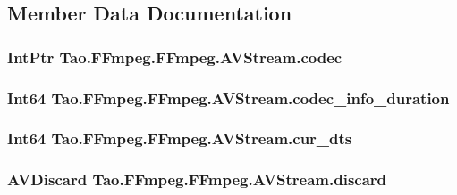 \subsection{Member Data Documentation}
\hypertarget{struct_tao_1_1_f_fmpeg_1_1_f_fmpeg_1_1_a_v_stream_a06f24f928655991d0e2c02bf3fa55456}{
\subsubsection[{codec}]{\setlength{\rightskip}{0pt plus 5cm}IntPtr {\bf Tao.FFmpeg.FFmpeg.AVStream.codec}}}
\label{struct_tao_1_1_f_fmpeg_1_1_f_fmpeg_1_1_a_v_stream_a06f24f928655991d0e2c02bf3fa55456}
\hypertarget{struct_tao_1_1_f_fmpeg_1_1_f_fmpeg_1_1_a_v_stream_ac092d42ff4777626fcd5dc1553d366f3}{
\subsubsection[{codec\_\-info\_\-duration}]{\setlength{\rightskip}{0pt plus 5cm}Int64 {\bf Tao.FFmpeg.FFmpeg.AVStream.codec\_\-info\_\-duration}}}
\label{struct_tao_1_1_f_fmpeg_1_1_f_fmpeg_1_1_a_v_stream_ac092d42ff4777626fcd5dc1553d366f3}
\hypertarget{struct_tao_1_1_f_fmpeg_1_1_f_fmpeg_1_1_a_v_stream_addbf6545a4879ddc633294e90b29a0d0}{
\subsubsection[{cur\_\-dts}]{\setlength{\rightskip}{0pt plus 5cm}Int64 {\bf Tao.FFmpeg.FFmpeg.AVStream.cur\_\-dts}}}
\label{struct_tao_1_1_f_fmpeg_1_1_f_fmpeg_1_1_a_v_stream_addbf6545a4879ddc633294e90b29a0d0}
\hypertarget{struct_tao_1_1_f_fmpeg_1_1_f_fmpeg_1_1_a_v_stream_aa94077cccff548456956cee7de239c1e}{
\subsubsection[{discard}]{\setlength{\rightskip}{0pt plus 5cm}AVDiscard {\bf Tao.FFmpeg.FFmpeg.AVStream.discard}}}

